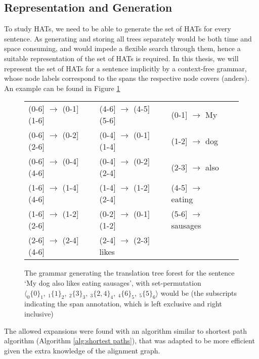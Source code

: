\documentclass{report}
\begin{document}
\subsection{Representation and Generation}

To study HATs, we need to be able to generate the set of HATs for every sentence. As generating and storing all trees separately would be both time and space consuming, and would impede a flexible search through them, hence a suitable representation of the set of HATs is required. In this thesis, we will represent the set of HATs for a sentence implicitly by a context-free grammar, whose node labels correspond to the spans the respective node covers (anders). An example can be found in Figure \ref{fig:grammar}

\begin{figure}[!ht]\begin{framed}
\small{
\begin{tabular}{llllll}
(0-6] $\rightarrow$ (0-1]  (1-6] && (4-6] $\rightarrow$ (4-5]  (5-6] && (0-1] $\rightarrow$ My\\
(0-6] $\rightarrow$ (0-2]  (2-6] && (0-4] $\rightarrow$ (0-1]  (1-4] && (1-2] $\rightarrow$ dog\\
(0-6] $\rightarrow$ (0-4]  (4-6] && (0-4] $\rightarrow$ (0-2]  (2-4] && (2-3] $\rightarrow$ also\\
(1-6] $\rightarrow$ (1-4]  (4-6] && (1-4] $\rightarrow$ (1-2]  (2-4] && (4-5] $\rightarrow$ eating\\
(1-6] $\rightarrow$ (1-2]  (2-6] && (0-2] $\rightarrow$ (0-1]  (1-2] && (5-6] $\rightarrow$ sausages\\
(2-6] $\rightarrow$ (2-4]  (4-6] && (2-4] $\rightarrow$ (2-3] likes\\
\end{tabular}
\caption{The grammar generating the translation tree forest for the sentence
`My dog also likes eating sausages', with set-permutation $\langle _0\{0\}_1,~ _1\{1\}_2,~ _2\{3\}_3,~ _3\{2,4\}_4, ~_4\{6\}_5,~ _5\{5\}_6\rangle$ would be (the subscripts indicating the span annotation, which is left exclusive and right inclusive)}\label{fig:grammar}
}
\end{framed}
\end{figure}

The allowed expansions were found with an algorithm similar to  shortest path algorithm (Algorithm \ref{alg:shortest paths}), that was adapted to be more efficient given the extra knowledge of the alignment graph.
\end{document}

